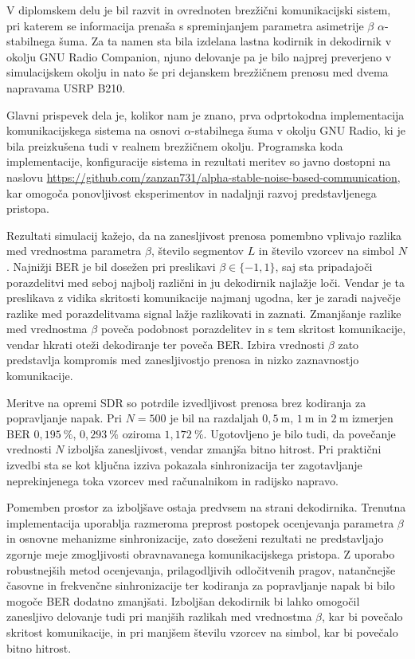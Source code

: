 \documentclass[a4paper, 12pt, openany]{book}
\begin{document}
V diplomskem delu je bil razvit in ovrednoten brezžični komunikacijski sistem, pri katerem se informacija prenaša s spreminjanjem parametra asimetrije $\beta$ $\alpha$-stabilnega šuma. Za ta namen sta bila izdelana lastna kodirnik in dekodirnik v okolju GNU Radio Companion, njuno delovanje pa je bilo najprej preverjeno v simulacijskem okolju in nato še pri dejanskem brezžičnem prenosu med dvema napravama USRP B210.

Glavni prispevek dela je, kolikor nam je znano, prva odprtokodna implementacija komunikacijskega sistema na osnovi $\alpha$-stabilnega šuma v okolju GNU Radio, ki je bila preizkušena tudi v realnem brezžičnem okolju. Programska koda implementacije, konfiguracije sistema in rezultati meritev so javno dostopni na naslovu \url{https://github.com/zanzan731/alpha-stable-noise-based-communication}, kar omogoča ponovljivost eksperimentov in nadaljnji razvoj predstavljenega pristopa.

Rezultati simulacij kažejo, da na zanesljivost prenosa pomembno vplivajo razlika med vrednostma parametra $\beta$, število segmentov $L$ in število vzorcev na simbol $N$. Najnižji BER je bil dosežen pri preslikavi $\beta\in\{-1,1\}$, saj sta pripadajoči porazdelitvi med seboj najbolj različni in ju dekodirnik najlažje loči. Vendar je ta preslikava z vidika skritosti komunikacije najmanj ugodna, ker je zaradi največje razlike med porazdelitvama signal lažje razlikovati in zaznati. Zmanjšanje razlike med vrednostma $\beta$ poveča podobnost porazdelitev in s tem skritost komunikacije, vendar hkrati oteži dekodiranje ter poveča BER. Izbira vrednosti $\beta$ zato predstavlja kompromis med zanesljivostjo prenosa in nizko zaznavnostjo komunikacije.

Meritve na opremi SDR so potrdile izvedljivost prenosa brez kodiranja za popravljanje napak. Pri $N=500$ je bil na razdaljah $0{,}5~\mathrm{m}$, $1~\mathrm{m}$ in $2~\mathrm{m}$ izmerjen BER $0{,}195~\%$, $0{,}293~\%$ oziroma $1{,}172~\%$. Ugotovljeno je bilo tudi, da povečanje vrednosti $N$ izboljša zanesljivost, vendar zmanjša bitno hitrost. Pri praktični izvedbi sta se kot ključna izziva pokazala sinhronizacija ter zagotavljanje neprekinjenega toka vzorcev med računalnikom in radijsko napravo.

Pomemben prostor za izboljšave ostaja predvsem na strani dekodirnika. Trenutna implementacija uporablja razmeroma preprost postopek ocenjevanja parametra $\beta$ in osnovne mehanizme sinhronizacije, zato doseženi rezultati ne predstavljajo zgornje meje zmogljivosti obravnavanega komunikacijskega pristopa. Z uporabo robustnejših metod ocenjevanja, prilagodljivih odločitvenih pragov, natančnejše časovne in frekvenčne sinhronizacije ter kodiranja za popravljanje napak bi bilo mogoče BER dodatno zmanjšati. Izboljšan dekodirnik bi lahko omogočil zanesljivo delovanje tudi pri manjših razlikah med vrednostma $\beta$, kar bi povečalo skritost komunikacije, in pri manjšem številu vzorcev na simbol, kar bi povečalo bitno hitrost.
\end{document}
